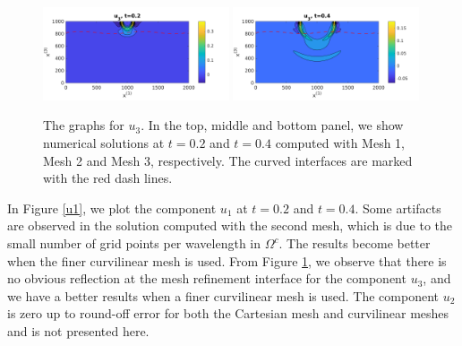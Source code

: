 \begin{figure}[htbp]
	\includegraphics[width=0.49\textwidth,trim={0.05cm 0.1cm 0.55cm 0.45cm}, clip]{u3_t02_curvi_finer.png}
	\includegraphics[width=0.49\textwidth,trim={0.05cm 0.1cm 0.55cm 0.45cm}, clip]{u3_t04_curvi_finer.png}
	\caption{The graphs for $u_3$. In the top, middle and bottom panel, we show numerical solutions at $t=0.2$ and $t=0.4$ computed with Mesh 1, Mesh 2 and Mesh 3, respectively. The curved interfaces are marked with the red dash lines.}
\label{u3}
\end{figure}
In Figure \ref{u1}, we plot the component $u_1$ at $t=0.2$ and $t=0.4$.  Some artifacts are observed in the solution computed with the second mesh, which is due to the small number of grid points per wavelength in $\Omega^c$. The results become better when the finer curvilinear mesh is used. From Figure \ref{u3}, we observe that there is no obvious reflection at the mesh refinement interface for the component $u_3$, and we have a better results when a finer curvilinear mesh is used. The component $u_2$ is zero up to round-off error for both the Cartesian mesh and curvilinear meshes and is not presented here.